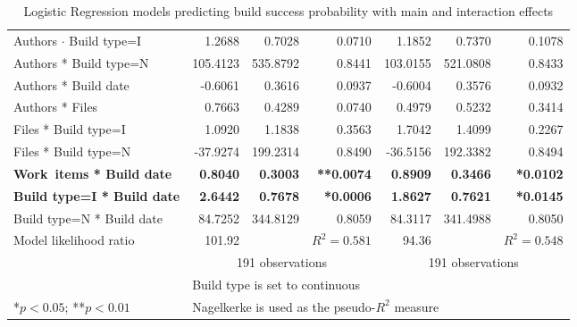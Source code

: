 \begin{table}[t]
\begin{center}
\begin{tabular}{l|r@{\hspace{5pt}}r@{\hspace{-5pt}}r|r@{\hspace{5pt}}r@{\hspace{-5pt}}r}
Authors $\cdot$ Build type=I            &   1.2688 &   0.7028 & 0.0710 &    1.1852 &    0.7370 &   0.1078 \\
Authors * Build type=N            & 105.4123 & 535.8792 & 0.8441 &  103.0155 &  521.0808 &   0.8433 \\
Authors * Build date         &  -0.6061 &   0.3616 & 0.0937 &   -0.6004 &    0.3576 &   0.0932 \\
Authors * Files             &   0.7663 &   0.4289 & 0.0740 &    0.4979 &    0.5232 &   0.3414 \\
Files * Build type=I              &   1.0920 &   1.1838 & 0.3563 &    1.7042 &    1.4099 &   0.2267 \\
Files * Build type=N              & -37.9274 & 199.2314 & 0.8490 &  -36.5156 &  192.3382 &   0.8494 \\
\textbf{Work~items * Build date}       &   \textbf{0.8040} &   \textbf{0.3003} & \textbf{**0.0074} &    \textbf{0.8909} &    \textbf{0.3466} &   \textbf{*0.0102} \\
\textbf{Build type=I * Build date}          &   \textbf{2.6442} &   \textbf{0.7678} & \textbf{*0.0006} &    \textbf{1.8627} &    \textbf{0.7621} &   \textbf{*0.0145} \\
Build type=N * Build date          &  84.7252 & 344.8129 & 0.8059 &   84.3117 &  341.4988 &   0.8050 \\
	\hline
Model likelihood ratio & 101.92 &  & $R^2=0.581$ & 94.36 &  &	$R^2 = 0.548$ \\
& \multicolumn{3}{c}{191 observations} & \multicolumn{3}{c}{191 observations} \\
\multicolumn{1}{l}{ } & \multicolumn{6}{l}{\scriptsize{Build type is set to continuous}} \\
\multicolumn{1}{l}{\scriptsize{*$p < 0.05$; **$p < 0.01$}} & \multicolumn{6}{l}{\scriptsize{Nagelkerke is used as the pseudo-$R^2$ measure}}
\end{tabular}
\end{center}
\caption{Logistic Regression models predicting build success probability with main and interaction effects}
\label{tab:logr}
\end{table}


